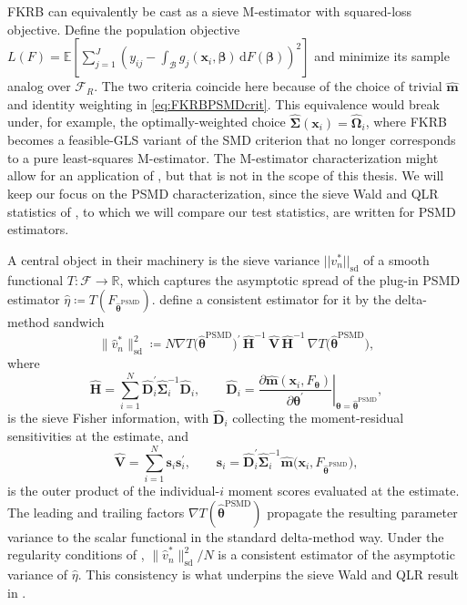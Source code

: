FKRB can equivalently be cast as a sieve M-estimator with squared-loss objective.
Define the population objective $L(F) = \mathbb{E}[\sum_{j=1}^J(y_{ij} - \int_{\mathcal{B}} g_j(\bm{x}_i,\bm{\beta})\,\mathrm{d}F(\bm{\beta}))^2]$ and minimize its sample analog over $\mathcal{F}_R$.
The two criteria coincide here because of the choice of trivial $\hat{\bm{m}}$ and identity weighting in \cref{eq:FKRBPSMDcrit}.
This equivalence would break under, for example, the optimally-weighted choice $\hat{\bm{\Sigma}}(\bm{x}_i) = \hat{\bm{\Omega}}_i$, where FKRB becomes a feasible-GLS variant of the SMD criterion that no longer corresponds to a pure least-squares M-estimator.
The M-estimator characterization might allow for an application of \citet{Li2025The,Li2025Inference}, but that is not in the scope of this thesis.
We will keep our focus on the PSMD characterization, since the sieve Wald and QLR statistics of \citet{ChenPouzo2015}, to which we will compare our test statistics, are written for PSMD estimators. 

A central object in their machinery is the sieve variance $||v^*_n||_{\mathrm{sd}}$ of a smooth functional $T:\mathcal{F}\to\mathbb{R}$, which captures the asymptotic spread of the plug-in PSMD estimator $\hat{\eta} \coloneq T(F_{\hat{\bm{\theta}}^{\mathrm{PSMD}}})$.
\citet[][eq.~(2.10)]{ChenPouzo2015} define a consistent estimator for it by the delta-method sandwich
\begin{equation}
\label{eq:sievevariance}
    \|\hat{v}^*_n\|^2_{\mathrm{sd}} \coloneq N\nabla T\!\bigl(\hat{\bm{\theta}}^{\mathrm{PSMD}}\bigr)^\prime\, \hat{\bm{H}}^{-1}\, \hat{\bm{V}}\, \hat{\bm{H}}^{-1}\, \nabla T\!\bigl(\hat{\bm{\theta}}^{\mathrm{PSMD}}\bigr),
\end{equation}
where
\begin{equation}
\label{eq:sieveinformation}
    \hat{\bm{H}} = \sum_{i=1}^{N}\hat{\bm{D}}_i^\prime\hat{\bm{\Sigma}}_i^{-1}\hat{\bm{D}}_i,\qquad \hat{\bm{D}}_i = \left.\frac{\partial \hat{\bm{m}}(\bm{x}_i,F_{\bm{\theta}})}{\partial \bm{\theta}^\prime}\right|_{\bm{\theta} = \hat{\bm{\theta}}^{\mathrm{PSMD}}},
\end{equation}
is the sieve Fisher information, with $\hat{\bm{D}}_i$ collecting the moment-residual sensitivities at the estimate, and
\begin{equation}
\label{eq:sievescorevariance}
    \hat{\bm{V}} = \sum_{i=1}^{N}\bm{s}_i\bm{s}_i^\prime,\qquad \bm{s}_i = \hat{\bm{D}}_i^\prime\hat{\bm{\Sigma}}_i^{-1}\hat{\bm{m}}\!\bigl(\bm{x}_i, F_{\hat{\bm{\theta}}^{\mathrm{PSMD}}}\bigr),
\end{equation}
is the outer product of the individual-$i$ moment scores evaluated at the estimate.
The leading and trailing factors $\nabla T(\hat{\bm{\theta}}^{\mathrm{PSMD}})$ propagate the resulting parameter variance to the scalar functional in the standard delta-method way.
Under the regularity conditions of \citet{ChenPouzo2015}, $\|\hat{v}^*_n\|^2_{\mathrm{sd}}/N$ is a consistent estimator of the asymptotic variance of $\hat{\eta}$.
This consistency is what underpins the sieve Wald and QLR result in \citet[theorems~4.2 and 4.3]{ChenPouzo2015}.

